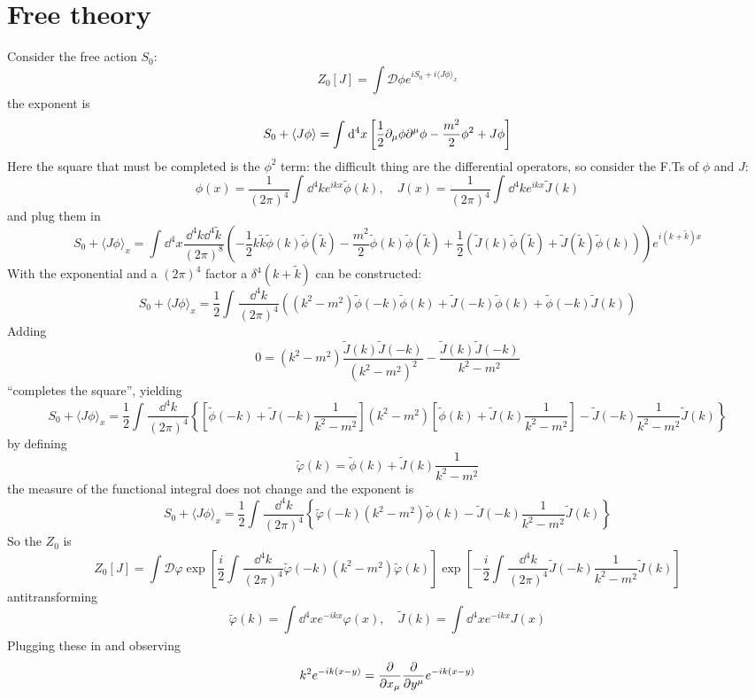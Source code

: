 \section{Free theory}
Consider the free action $S_0$:
\[
    Z_0[J] = \int \mathcal{D}\phi e^{iS_0+i\langle J\phi\rangle_x}
\]
the exponent is
\[
    S_0 + \langle J\phi\rangle = \int_{}^{} \dd^4x \left[\frac{1}{2}\partial_\mu\phi
    \partial^\mu\phi - \frac{m^2}{2}\phi^2+J\phi\right]
\]
Here the square that must be completed is the $\phi^2$ term: the difficult thing
are the differential operators, so consider the F.Ts of $\phi$ and $J$:
\[
    \phi(x)=\frac{1}{(2\pi)^4}\int_{}^{} \dd ^4k e^{ikx}\tilde\phi(k),\quad 
    J(x)=\frac{1}{(2\pi)^4}\int_{}^{} \dd^4k e^{ikx}\tilde J(k)
\]
and plug them in
\[
S_0+\langle J\phi\rangle_x = \int_{}^{} \dd^4x\frac{\dd^4k\dd^4\tilde k}{
(2\pi)^8}\left(-\frac{1}{2}k\tilde k\tilde\phi(k)\tilde \phi(\tilde k) -
\frac{m^2}{2}\tilde\phi(k)\tilde\phi(\tilde k)+\frac{1}{2}\left(
\tilde J(k)\tilde\phi(\tilde k) + \tilde J(\tilde k)\tilde \phi(k)\right)\right)
e^{i(k+\tilde k)x}
\]
With the exponential and a $(2\pi)^4$ factor a $\delta^4(k+\tilde k)$ can be
constructed:
\[
S_0+\langle J\phi\rangle_x = \frac{1}{2}\int_{}^{} \frac{\dd^4k}{(2\pi)^4}
\left(
\left(k^2-m^2\right)\tilde\phi(-k)\tilde\phi(k) +\tilde J(-k)\tilde\phi(k)+
\tilde\phi(-k)\tilde J(k)
\right)
\]
Adding 
\[
0 = (k^2-m^2)\frac{\tilde J(k)\tilde J(-k)}{(k^2-m^2)^2}-
\frac{\tilde J(k)\tilde J(-k)}{k^2-m^2}
\]
``completes the square'', yielding
\[
S_0 + \langle J\phi\rangle_x = 
\frac{1}{2}\int_{}^{} \frac{\dd^4k}{(2\pi)^4}
\left\{
\left[\tilde \phi(-k)+\tilde J(-k)\frac{1}{k^2-m^2}\right](k^2-m^2)
\left[\tilde \phi(k)+\tilde J(k)\frac{1}{k^2-m^2}\right] - \tilde J(-k)\frac{1}{
k^2-m^2}\tilde J(k)
\right\}
\]
by defining
\[
\tilde \varphi(k) = \tilde \phi(k) + \tilde J(k)\frac{1}{k^2-m^2}
\]
the measure of the functional integral does not change and the exponent is
\[
S_0+\langle J\phi\rangle_x = 
\frac{1}{2}\int_{}^{} \frac{\dd^4k}{(2\pi)^4}
\left\{
\tilde \varphi(-k)(k^2-m^2)\tilde\phi(k)-\tilde J(-k)\frac{1}{k^2-m^2}\tilde J(k)
\right\}
\]
So the $Z_0$ is
\[
    Z_0[J] = \int \mathcal{D}\varphi \exp\left[ \frac{i}{2}
    \int_{}^{} \frac{\dd^4k}{(2\pi)^4}\tilde \varphi(-k)(k^2-m^2)\tilde\varphi(k)
\right]\exp\left[ -\frac{i}{2}\int_{}^{} \frac{\dd^4k}{(2\pi)^4}
\tilde J(-k)\frac{1}{k^2-m^2}\tilde J(k) \right]
\]
antitransforming
\[
    \tilde\varphi(k)=\int_{}^{} \dd ^4x e^{-ikx}\varphi(x),\quad
    \tilde J(k) = \int_{}^{} \dd ^4x e^{-ikx} J(x)
\]
Plugging these in and observing
\[
    k^2 e^{-ik(x-y)}=\pdv{}{x_\mu}\pdv{}{y^\mu}e^{-ik(x-y)}
\]
